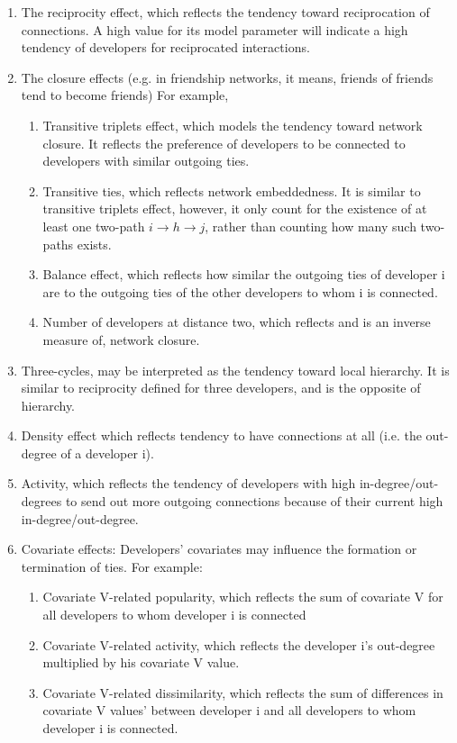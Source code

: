 \documentclass[12pt]{report}
\begin{document}
\begin{enumerate}
\item{The reciprocity effect, which reflects the tendency toward reciprocation of connections. A high value for its model parameter will indicate a high tendency of developers for reciprocated interactions.}
\item{The closure effects (e.g. in friendship networks, it means, friends of friends tend to become friends)}
For example, 
\begin{enumerate}
\item Transitive triplets effect, which models the tendency toward network closure. It reflects the preference of developers to be connected to developers with similar outgoing ties.  
\item Transitive ties, which reflects network embeddedness. It is similar to transitive triplets effect, however, it only count for the existence of at least one two-path  $i \rightarrow h \rightarrow j$, rather than counting how many such two-paths exists.  
\item Balance effect, which reflects how similar the outgoing ties of developer i are to the outgoing ties of the other developers to whom i is connected. 
\item Number of developers at distance two, which reflects and is an inverse measure of, network closure. 
\end{enumerate}
\item{Three-cycles, may be interpreted as the tendency toward local hierarchy. It is similar to reciprocity defined for three developers, and is the opposite of hierarchy.}
\item{Density effect which reflects tendency to have connections at all (i.e. the out-degree of a developer i).}
\item{Activity, which reflects the tendency of developers with high in-degree/out-degrees to send out more outgoing connections because of their current high in-degree/out-degree.}
\item Covariate effects: Developers' covariates may influence the formation or termination of ties. For example:
\begin{enumerate}
\item{Covariate V-related popularity, which reflects the sum of covariate V for all developers to whom developer i is connected}
\item{Covariate V-related activity, which reflects the developer i's out-degree multiplied by his covariate V value.}
\item{Covariate V-related dissimilarity, which reflects the sum of differences in covariate V values' between developer i and all developers to whom developer i is connected.}
\end{enumerate}


\end{enumerate}
\end{document}
